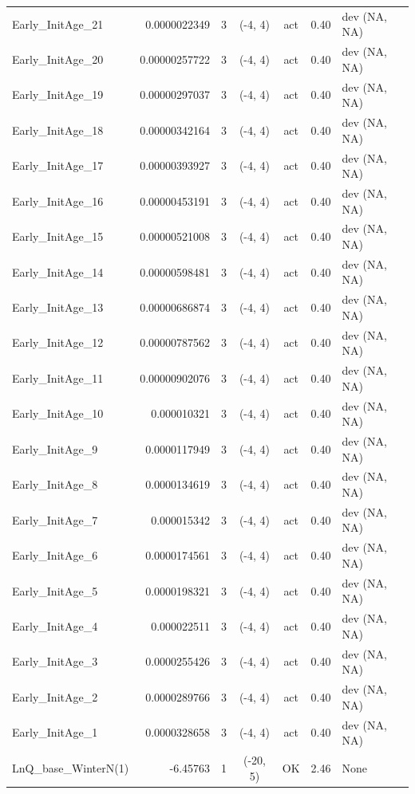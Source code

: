\documentclass[12pt,]{article}
\begin{document}
\begin{landscape}
\begin{longtable}{lrcccll}
  Early\_InitAge\_21 & 0.0000022349 & 3 & (-4, 4) & act & 0.40 & dev (NA, NA) \\ 
  Early\_InitAge\_20 & 0.00000257722 & 3 & (-4, 4) & act & 0.40 & dev (NA, NA) \\ 
  Early\_InitAge\_19 & 0.00000297037 & 3 & (-4, 4) & act & 0.40 & dev (NA, NA) \\ 
  Early\_InitAge\_18 & 0.00000342164 & 3 & (-4, 4) & act & 0.40 & dev (NA, NA) \\ 
  Early\_InitAge\_17 & 0.00000393927 & 3 & (-4, 4) & act & 0.40 & dev (NA, NA) \\ 
  Early\_InitAge\_16 & 0.00000453191 & 3 & (-4, 4) & act & 0.40 & dev (NA, NA) \\ 
  Early\_InitAge\_15 & 0.00000521008 & 3 & (-4, 4) & act & 0.40 & dev (NA, NA) \\ 
  Early\_InitAge\_14 & 0.00000598481 & 3 & (-4, 4) & act & 0.40 & dev (NA, NA) \\ 
  Early\_InitAge\_13 & 0.00000686874 & 3 & (-4, 4) & act & 0.40 & dev (NA, NA) \\ 
  Early\_InitAge\_12 & 0.00000787562 & 3 & (-4, 4) & act & 0.40 & dev (NA, NA) \\ 
  Early\_InitAge\_11 & 0.00000902076 & 3 & (-4, 4) & act & 0.40 & dev (NA, NA) \\ 
  Early\_InitAge\_10 & 0.000010321 & 3 & (-4, 4) & act & 0.40 & dev (NA, NA) \\ 
  Early\_InitAge\_9 & 0.0000117949 & 3 & (-4, 4) & act & 0.40 & dev (NA, NA) \\ 
  Early\_InitAge\_8 & 0.0000134619 & 3 & (-4, 4) & act & 0.40 & dev (NA, NA) \\ 
  Early\_InitAge\_7 & 0.000015342 & 3 & (-4, 4) & act & 0.40 & dev (NA, NA) \\ 
  Early\_InitAge\_6 & 0.0000174561 & 3 & (-4, 4) & act & 0.40 & dev (NA, NA) \\ 
  Early\_InitAge\_5 & 0.0000198321 & 3 & (-4, 4) & act & 0.40 & dev (NA, NA) \\ 
  Early\_InitAge\_4 & 0.000022511 & 3 & (-4, 4) & act & 0.40 & dev (NA, NA) \\ 
  Early\_InitAge\_3 & 0.0000255426 & 3 & (-4, 4) & act & 0.40 & dev (NA, NA) \\ 
  Early\_InitAge\_2 & 0.0000289766 & 3 & (-4, 4) & act & 0.40 & dev (NA, NA) \\ 
  Early\_InitAge\_1 & 0.0000328658 & 3 & (-4, 4) & act & 0.40 & dev (NA, NA) \\ 
  LnQ\_base\_WinterN(1) & -6.45763 & 1 & (-20, 5) & OK & 2.46 & None \\ 

\end{longtable}
\end{landscape}
\end{document}
